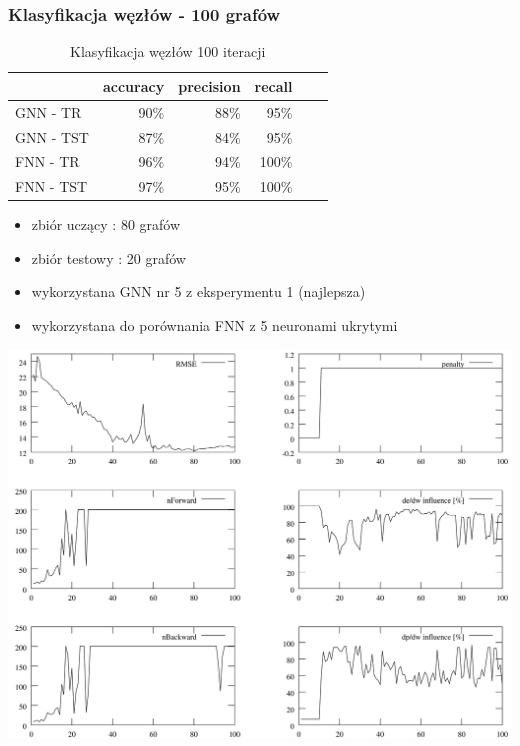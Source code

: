 \documentclass{beamer}
\begin{document}
\begin{frame}
\frametitle{Klasyfikacja węzłów - 100 grafów}
\setlength{\tabcolsep}{2pt}
\begin{table}[h!]
	\begin{center}
	\begin{tabular}{lrrrrr}
	\toprule
	& accuracy & precision & recall \\
	\midrule
	GNN - TR	&	90\% & 88\% & 95\% \\
	GNN - TST	&	87\% & 84\% & 95\% \\
	\midrule
	FNN - TR	&	96\% & 94\% & 100\% \\
	FNN - TST	&	97\% & 95\% & 100\% \\
	\bottomrule
	\end{tabular}
	\caption{Klasyfikacja węzłów 100 iteracji}
	\end{center}
\end{table}
\begin{itemize}
	\item zbiór uczący : 80 grafów
	\item zbiór testowy : 20 grafów
	\item wykorzystana GNN nr 5 z eksperymentu 1 (najlepsza)
	\item wykorzystana do porównania FNN z 5 neuronami ukrytymi
\end{itemize}
\end{frame}
\begin{frame}
	\includegraphics[scale=0.065]{img/80graphs}
\end{frame}
\end{document}
